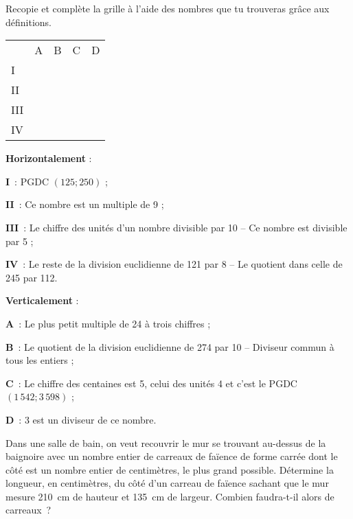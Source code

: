 \begin{exercice}
Recopie et complète la grille à l'aide des nombres que tu trouveras grâce aux définitions.

\begin{center}
\begin{tabularx}{.6\linewidth}{X|X|X|X|X|}
 & \cellcolor {F2} A & \cellcolor {F2} B & \cellcolor {F2} C & \cellcolor {F2} D \\\cline{2-5}
\cellcolor{H1} I & \cellcolor{G3} & \cellcolor{G3} & \cellcolor{G3} & \cellcolor{Noir} \\\cline{2-5}
\cellcolor{H1} II & \cellcolor{G3} & \cellcolor{G3} & \cellcolor{G3} & \cellcolor{G3} \\\cline{2-5}
\cellcolor{H1} III & \cellcolor{G3} & \cellcolor{Noir} & \cellcolor{G3} & \cellcolor{G3} \\\cline{2-5}
\cellcolor{H1} IV & \cellcolor{Noir} & \cellcolor{G3} & \cellcolor{Noir} & \cellcolor{G3} \\\cline{2-5}
\end{tabularx}
\end{center}

\textbf{Horizontalement} :

\textcolor{H1}{\textbf{I}} : PGDC $(125 ; 250)$ ;

\textcolor{H1}{\textbf{II}} : Ce nombre est un multiple de 9 ;

\textcolor{H1}{\textbf{III}} : Le chiffre des unités d'un nombre divisible par 10 -- Ce nombre est divisible par 5 ;

\textcolor{H1}{\textbf{IV}} : Le reste de la division euclidienne de 121 par 8 -- Le quotient dans celle de 245 par 112.

\textbf{Verticalement} :

\textcolor{F2}{\textbf{A}} : Le plus petit multiple de 24 à trois chiffres ;

\textcolor{F2}{\textbf{B}} : Le quotient de la division euclidienne de 274 par 10 -- Diviseur commun à tous les entiers ;

\textcolor{F2}{\textbf{C}} : Le chiffre des centaines est 5, celui des unités 4 et c'est le PGDC $(1\,542 ; 3\,598)$ ;

\textcolor{F2}{\textbf{D}} : 3 est un diviseur de ce nombre.
\end{exercice}

\begin{exercice}[Carrelage]
Dans une salle de bain, on veut recouvrir le mur se trouvant au-dessus de la baignoire avec un nombre entier de carreaux de faïence de forme carrée dont le côté est un nombre entier de centimètres, le plus grand possible. Détermine la longueur, en centimètres, du côté d'un carreau de faïence sachant que le mur mesure 210 cm de hauteur et 135 cm de largeur. Combien faudra-t-il alors de carreaux ?
\end{exercice}

